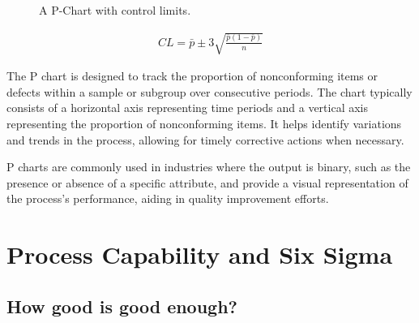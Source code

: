 \documentclass[
  a4paper,
]{scrbook}
\begin{document}
\begin{figure}[H]


\caption{\label{fig-p-chart}A P-Chart with control limits.}

\end{figure}%

\begin{align}
CL = \bar{p} \pm 3\sqrt{\frac{\bar{p}(1-\bar{p})}{n}}
\end{align}

The P chart is designed to track the proportion of nonconforming items
or defects within a sample or subgroup over consecutive periods. The
chart typically consists of a horizontal axis representing time periods
and a vertical axis representing the proportion of nonconforming items.
It helps identify variations and trends in the process, allowing for
timely corrective actions when necessary.

P charts are commonly used in industries where the output is binary,
such as the presence or absence of a specific attribute, and provide a
visual representation of the process's performance, aiding in quality
improvement efforts.

\section{Process Capability and Six
Sigma}\label{process-capability-and-six-sigma}

\subsection{How good is good enough?}\label{how-good-is-good-enough}
\end{document}
